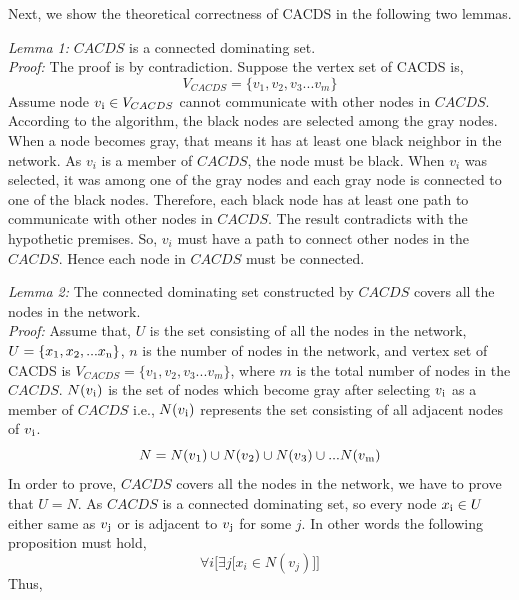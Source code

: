 Next, we show the theoretical correctness of CACDS in the following two lemmas.

\textit{Lemma 1:} $CACDS$ is a connected dominating set.\\
\textit{Proof:} 
The proof is by contradiction.
Suppose the vertex set of CACDS is, $$V_{CACDS} = \{v_1,v_2,v_3...v_m\}$$
Assume node $v\textsubscript{i} \in V_{CACDS}$ cannot communicate with other nodes in $CACDS$. %
According to the algorithm, the black nodes are selected among the gray nodes. When a node becomes gray, that means it has at least one black neighbor in the network. As $v_i$ is a member of $CACDS$, the node must be black. When $v_i$ was selected, it was among one of the gray nodes and each gray node is connected to one of the black nodes. Therefore, each black node has at least one path to communicate with other nodes in $CACDS$. The result contradicts with the hypothetic premises. So, $v_i$ must have a path to connect other nodes in the $CACDS$. Hence each node in $CACDS$ must be connected. 

\textit{Lemma 2:} The connected dominating set constructed by $CACDS$ covers all the nodes in the network.\\
\textit{Proof:} Assume that, $U$ is the set consisting of all the nodes in the network, $U = \{x\textsubscript{1},x\textsubscript{2},...x\textsubscript{n}\}$, $n$ is the number of nodes in the network, and vertex set of CACDS is $V_{CACDS} = \{v_1,v_2,v_3...v_m\}$,
where $m$ is the total number of nodes in the $CACDS$. $N(v\textsubscript{i})$ is the set of nodes which become gray after selecting $v\textsubscript{i}$ as a member of $CACDS$ i.e., $N(v\textsubscript{i})$ represents the set consisting of all adjacent nodes of $v\textsubscript{i}$.\\
\begin{equation}
N = N(v\textsubscript{1}) \cup N(v\textsubscript{2}) \cup N(v\textsubscript{3}) \cup ... N(v\textsubscript{m})
\end{equation}
In order to prove, $CACDS$ covers all the nodes in the network, we have to prove that $U = N$.
As $CACDS$ is a connected dominating set, so every node $x\textsubscript{i} \in U$  either same as $v\textsubscript{j}$ or is adjacent to $v\textsubscript{j}$ for some $j$. In other words the following proposition must hold, 
$$ \forall i \Big[\exists j \big[x_i \in N(v_j) \big] \Big]$$
Thus,

